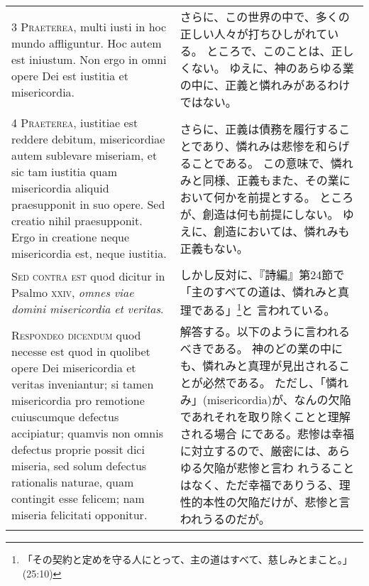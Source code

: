\documentclass[10pt]{jsarticle} %
\begin{document}
{\begin{longtable}{p{21em}p{21em}}
\\


{\scshape 3 Praeterea}, multi iusti in hoc mundo
affliguntur. Hoc autem est iniustum. Non ergo in omni opere Dei est
iustitia et misericordia.


&


さらに、この世界の中で、多くの正しい人々が打ちひしがれている。
ところで、このことは、正しくない。
ゆえに、神のあらゆる業の中に、正義と憐れみがあるわけではない。

\\


{\scshape 4 Praeterea}, iustitiae est reddere debitum,
misericordiae autem sublevare miseriam, et sic tam iustitia quam
misericordia aliquid praesupponit in suo opere. Sed creatio nihil
praesupponit. Ergo in creatione neque misericordia est, neque iustitia.


&

さらに、正義は債務を履行することであり、憐れみは悲惨を和らげることである。
この意味で、憐れみと同様、正義もまた、その業において何かを前提とする。
ところが、創造は何も前提にしない。
ゆえに、創造においては、憐れみも正義もない。


\\


{\scshape Sed contra est} quod dicitur in Psalmo {\scshape xxiv},
{\itshape omnes viae domini misericordia et veritas}.


&

しかし反対に、『詩編』第24節で「主のすべての道は、憐れみと真理である」\footnote{「その契約と定めを守る人にとって、主の道はすべて、慈しみとまこと。」(25:10)}と
 言われている。

\\


{\scshape Respondeo dicendum} quod necesse est quod in
quolibet opere Dei misericordia et veritas inveniantur; si tamen
misericordia pro remotione cuiuscumque defectus accipiatur; quamvis non
omnis defectus proprie possit dici miseria, sed solum defectus
rationalis naturae, quam contingit esse felicem; nam miseria felicitati
opponitur. 

&

解答する。以下のように言われるべきである。
神のどの業の中にも、憐れみと真理が見出されることが必然である。
ただし、「憐れみ」(misericordia)が、なんの欠陥であれそれを取り除くことと理解される場合
 にである。悲惨は幸福に対立するので、厳密には、あらゆる欠陥が悲惨と言わ
 れうることはなく、ただ幸福でありうる、理性的本性の欠陥だけが、悲惨と言
 われうるのだが。


\end{longtable}}
\end{document}
